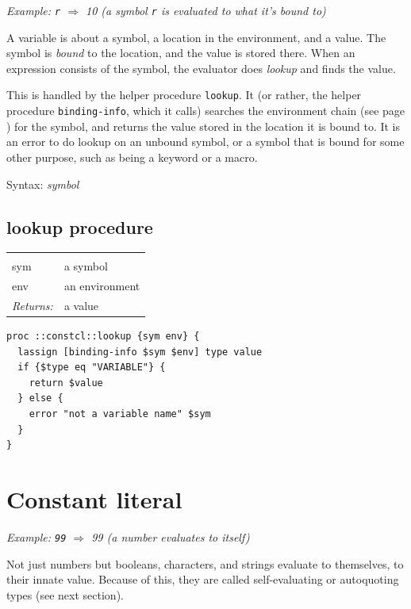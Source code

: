 \documentclass[twoside]{report}
\begin{document}
\emph{Example: \texttt{r} $\Rightarrow$ 10 (a symbol \texttt{r} is evaluated to what it's bound to)}

A variable is about a symbol, a location in the environment, and a value. The symbol is \emph{bound} to the location, and the value is stored there. When an expression consists of the symbol, the evaluator does \emph{lookup} and finds the value.

This is handled by the helper procedure \texttt{lookup}. It (or rather, the helper procedure \texttt{binding-info}, which it calls) searches the environment chain (see page \pageref{environments}) for the symbol, and returns the value stored in the location it is bound to. It is an error to do lookup on an unbound symbol, or a symbol that is bound for some other purpose, such as being a keyword or a macro.

Syntax: \emph{symbol}

\subsection{lookup procedure}
\label{lookup-procedure}

\noindent\begin{tabular}{ |p{1.9cm} p{8cm}| }
\hline
\rowcolor[HTML]{CCCCCC} \multicolumn{2}{|l|}{\bf lookup (internal)} \\
sym & a symbol \\
env & an environment \\
\textit{Returns:} & a value \\
\hline
\end{tabular}

\begin{lstlisting}
proc ::constcl::lookup {sym env} {
  lassign [binding-info $sym $env] type value
  if {$type eq "VARIABLE"} {
    return $value
  } else {
    error "not a variable name" $sym
  }
}
\end{lstlisting}

\section{Constant literal}
\label{constant-literal}

\emph{Example: \texttt{99} $\Rightarrow$ 99 (a number evaluates to itself)}

Not just numbers but booleans, characters, and strings evaluate to themselves, to their innate value. Because of this, they are called self-evaluating or autoquoting types (see next section).
\end{document}
